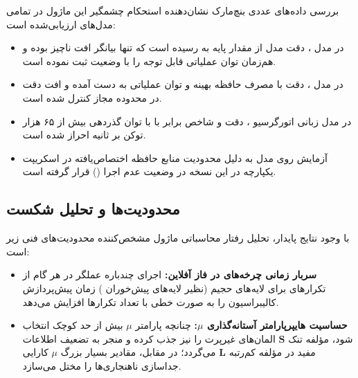 بررسی داده‌های عددی بنچ‌مارک نشان‌دهنده استحکام چشمگیر این ماژول در تمامی مدل‌های ارزیابی‌شده است:
\begin{itemize}
    \item در مدل ، دقت مدل از مقدار پایه  به  رسیده است که تنها بیانگر افت ناچیز  بوده و هم‌زمان توان عملیاتی قابل توجه  را با وضعیت  ثبت نموده است.
    \item در مدل ، دقت  با مصرف حافظه بهینه  و توان عملیاتی  به دست آمده و افت دقت در محدوده مجاز کنترل شده است.
    \item در مدل زبانی اتورگرسیو ، دقت  و شاخص  برابر با  با توان گذردهی بیش از ۶۵ هزار توکن بر ثانیه احراز شده است.
    \item آزمایش روی مدل  به دلیل محدودیت منابع حافظه اختصاص‌یافته در اسکریپت یکپارچه در این نسخه در وضعیت عدم اجرا () قرار گرفته است.
\end{itemize}

\subsection{محدودیت‌ها و تحلیل شکست}
با وجود نتایج پایدار، تحلیل رفتار محاسباتی ماژول  مشخص‌کننده محدودیت‌های فنی زیر است:
\begin{itemize}
    \item \textbf{سربار زمانی چرخه‌های  در فاز آفلاین:} اجرای چندباره عملگر  در هر گام از تکرارهای  برای لایه‌های حجیم (نظیر لایه‌های پیش‌خوران ) زمان پیش‌پردازش کالیبراسیون را به صورت خطی با تعداد تکرارها افزایش می‌دهد.
    \item \textbf{حساسیت هایپرپارامتر آستانه‌گذاری $\mu$:} چنانچه پارامتر $\mu$ بیش از حد کوچک انتخاب شود، مؤلفه تنک $\mathbf{S}$ المان‌های غیرپرت را نیز جذب کرده و منجر به تضعیف اطلاعات مفید در مؤلفه کم‌رتبه $\mathbf{L}$ می‌گردد؛ در مقابل، مقادیر بسیار بزرگ $\mu$ کارایی جداسازی ناهنجاری‌ها را مختل می‌سازد.
\end{itemize}
